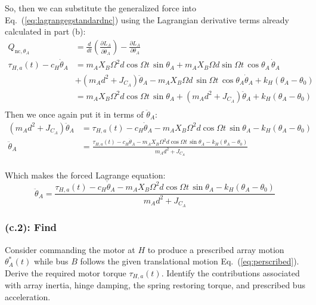 \documentclass[titlepage]{article}
\begin{document}
So, then we can substitute the generalized force into Eq.~(\ref{eq:lagrangegstandardnc}) using the Lagrangian derivative terms already calculated in part (b):
\begin{equation}
	\begin{split}
		Q_{\text{nc},\theta_A}&=\frac{d}{dt}\left(\frac{\partial L_A}{\partial\dot{\theta}_A}\right)-\frac{\partial L_A}{\partial\theta_A} \\
		\tau_{H,a}(t)-c_H\dot{\theta}_A&=m_AX_B\Omega^2d\cos\Omega t\,\sin\theta_A+m_AX_B\Omega d\sin\Omega t\,\cos\theta_A\,\dot{\theta}_A \\
		&+\left(m_Ad^2+J_{C_A}\right)\ddot{\theta}_A-m_AX_B\Omega d\,\sin\Omega t\,\cos\theta_A\dot{\theta}_A+k_H\left(\theta_A-\theta_0\right) \\
		&=m_AX_B\Omega^2d\cos\Omega t\,\sin\theta_A+\left(m_Ad^2+J_{C_A}\right)\ddot{\theta}_A+k_H\left(\theta_A-\theta_0\right) \\
	\end{split}
\end{equation}
Then we once again put it in terms of $\ddot{\theta}_A$:
\begin{equation}
	\begin{split}
		\left(m_Ad^2+J_{C_A}\right)\ddot{\theta}_A&=\tau_{H,a}(t)-c_H\dot{\theta}_A-m_AX_B\Omega^2d\cos\Omega t\,\sin\theta_A-k_H\left(\theta_A-\theta_0\right) \\
		\ddot{\theta}_A&=\frac{\tau_{H,a}(t)-c_H\dot{\theta}_A-m_AX_B\Omega^2d\cos\Omega t\,\sin\theta_A-k_H\left(\theta_A-\theta_0\right)}{m_Ad^2+J_{C_A}} \\
	\end{split}
\end{equation}

\begin{mdframed}[linewidth=1pt, innertopmargin=10pt, innerbottommargin=10pt]
	Which makes the forced Lagrange equation:
	\begin{equation}
		\ddot{\theta}_A=\frac{\tau_{H,a}(t)-c_H\dot{\theta}_A-m_AX_B\Omega^2d\cos\Omega t\,\sin\theta_A-k_H\left(\theta_A-\theta_0\right)}{m_Ad^2+J_{C_A}}
		\label{eq:forcedlagrange}
	\end{equation}
\end{mdframed}

\subsubsection*{(c.2): Find}
Consider commanding the motor at $H$ to produce a prescribed array motion $\theta_A^*(t)$ while bus $B$ follows the given translational motion Eq.~(\ref{eq:perscribed}). Derive the required motor torque $\tau_{H,a}(t)$. Identify the contributions associated with array inertia, hinge damping, the spring restoring torque, and prescribed bus acceleration.\\
\end{document}
